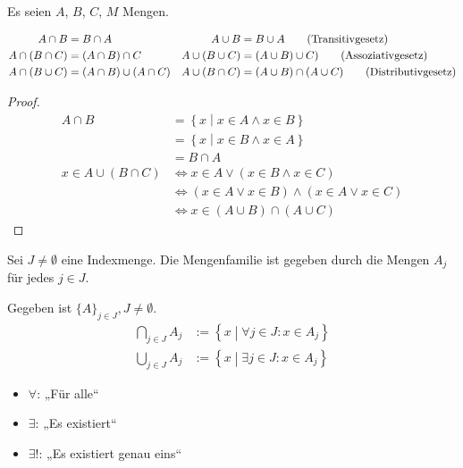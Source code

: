 \begin{theorem}
  Es seien $A$, $B$, $C$, $M$ Mengen.

  \begin{align*}
    A \cap B &= B \cap A & A \cup B &= B \cup A \tag{Transitivgesetz\index{Menge!Kommutativgesetz}} \\
    A \cap (B \cap C) &= (A \cap B) \cap C & A \cup (B \cup C) &= (A \cup B) \cup C) \tag{Assoziativgesetz\index{Menge!Assoziativgesetz}} \\
    A \cap (B \cup C) &= (A \cap B) \cup (A \cap C) & A \cup (B \cap C) &= (A \cup B) \cap (A \cup C) \tag{Distributivgesetz\index{Menge!Distributivgesetz}}
  \end{align*}
\end{theorem}
\begin{proof}
  \begin{align*}
    A \cap B &= \left\{ x \middle| x \in A \wedge x \in B \right\} \\
    \, &= \left\{ x \middle| x \in B \wedge x \in A \right\} \\
    \, &= B \cap A \\
    x \in A \cup (B \cap C) &\iff x \in A \vee (x \in B \wedge x \in C) \\
    \, &\iff (x \in A \vee x \in B) \wedge (x \in A \vee x \in C) \\
    \, &\iff x \in (A \cup B) \cap (A \cup C)
  \end{align*}
\end{proof}

\begin{definition}
  Sei $J \ne \emptyset$ eine Indexmenge. Die Mengenfamilie ist gegeben durch die Mengen $A_j$ für jedes $j \in J$.
\end{definition}

\begin{definition}
  Gegeben ist $\{A\}_{j \in J}, J \ne \emptyset$.
  \begin{align*}
    \bigcap_{j \in J} A_j &:= \left\{ x \middle| \forall j \in J: x \in A_j \right\} \\
    \bigcup_{j \in J} A_j &:= \left\{ x \middle| \exists j \in J: x \in A_j \right\}
  \end{align*}
\end{definition}

\begin{definition}
  \begin{itemize}
  \item $\forall$: „Für alle“\index[sym]{$\forall$}
  \item $\exists$: „Es existiert“\index[sym]{$\exists$}
  \item $\exists!$: „Es existiert genau eins“
  \end{itemize}
\end{definition}

